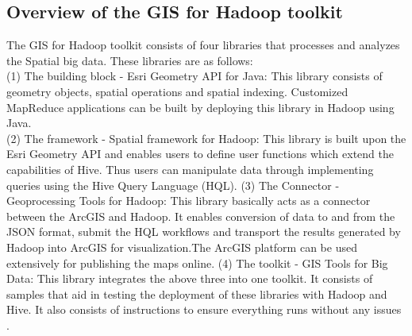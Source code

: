 \subsection{Overview of the GIS for Hadoop toolkit}
The GIS for Hadoop toolkit consists of four libraries that processes and analyzes the Spatial big data. These libraries are as follows: \\
(1) The building block - Esri Geometry API for Java: This library consists of geometry objects, spatial operations and spatial indexing. Customized MapReduce applications can be built by deploying this library in Hadoop using Java.\\
(2) The framework - Spatial framework for Hadoop: This library is built upon the Esri Geometry API and enables users to define user functions which extend the capabilities of Hive. Thus users can manipulate data through implementing queries using the Hive Query Language (HQL). 
(3) The Connector - Geoprocessing Tools for Hadoop: This library basically acts as a connector between the ArcGIS and Hadoop. It enables conversion of data to and from the JSON format, submit the HQL workflows and transport the results generated by Hadoop into ArcGIS for visualization.The ArcGIS platform can be used extensively for publishing the maps online.
(4) The toolkit - GIS Tools for Big Data: This library integrates the above three into one toolkit. It consists of samples that aid in testing the deployment of these libraries with Hadoop and Hive. It also consists of instructions to ensure everything runs without any issues \cite{link7}.

